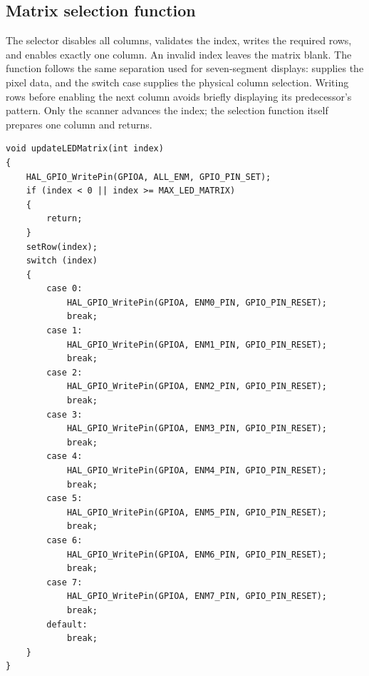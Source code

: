 \documentclass[a4paper]{article}
\newcommand{\code}[1]{\texttt{\detokenize{#1}}}
\newcommand{\topic}[1]{\subsection{#1}}
\begin{document}
\topic{Matrix selection function}
The selector disables all columns, validates the index, writes the required
rows, and enables exactly one column. An invalid index leaves the matrix blank.
The function follows the same separation used for seven-segment displays:
\code{setRow(index)} supplies the pixel data, and the switch case supplies
the physical column selection. Writing rows before enabling the next column
avoids briefly displaying its predecessor's pattern. Only the scanner advances
the index; the selection function itself prepares one column and returns.
\par\noindent\begin{minipage}{\linewidth}
\begin{lstlisting}[caption={updateLEDMatrix function}]
void updateLEDMatrix(int index)
{
    HAL_GPIO_WritePin(GPIOA, ALL_ENM, GPIO_PIN_SET);
    if (index < 0 || index >= MAX_LED_MATRIX)
    {
        return;
    }
    setRow(index);
    switch (index)
    {
        case 0:
            HAL_GPIO_WritePin(GPIOA, ENM0_PIN, GPIO_PIN_RESET);
            break;
        case 1:
            HAL_GPIO_WritePin(GPIOA, ENM1_PIN, GPIO_PIN_RESET);
            break;
        case 2:
            HAL_GPIO_WritePin(GPIOA, ENM2_PIN, GPIO_PIN_RESET);
            break;
        case 3:
            HAL_GPIO_WritePin(GPIOA, ENM3_PIN, GPIO_PIN_RESET);
            break;
        case 4:
            HAL_GPIO_WritePin(GPIOA, ENM4_PIN, GPIO_PIN_RESET);
            break;
        case 5:
            HAL_GPIO_WritePin(GPIOA, ENM5_PIN, GPIO_PIN_RESET);
            break;
        case 6:
            HAL_GPIO_WritePin(GPIOA, ENM6_PIN, GPIO_PIN_RESET);
            break;
        case 7:
            HAL_GPIO_WritePin(GPIOA, ENM7_PIN, GPIO_PIN_RESET);
            break;
        default:
            break;
    }
}
\end{lstlisting}
\end{minipage}\par
\end{document}
